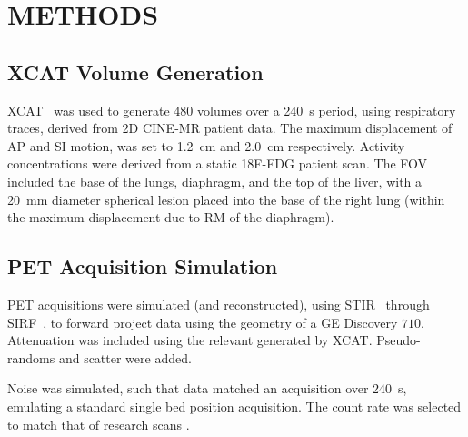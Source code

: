 
\section{METHODS} \label{sec:methods}
    \subsection{\acrshort{XCAT} Volume Generation} \label{sec:xcat_volume_generation}
        \acrshort{XCAT}~\cite{Segars2010} was used to generate $480$ volumes over a \SI{240}{\second} period, using respiratory traces, derived from \acrshort{2D} CINE-\acrshort{MR} patient data. The maximum displacement of \gls{AP} and \gls{SI} motion, was set to \SI{1.2}{\centi\metre} and \SI{2.0}{\centi\metre} respectively. Activity concentrations were derived from a static \acrshort{18F-FDG} patient scan. The \acrlong{FOV} included the base of the lungs, diaphragm, and the top of the liver, with a \SI{20}{\milli\metre} diameter spherical lesion %
        placed into the base of the right lung (within the maximum displacement due to \acrlong{RM} of the diaphragm).
    
    
    \subsection{\acrshort{PET} Acquisition Simulation} \label{sec:pet_acquisition_simulation}
        \acrshort{PET} acquisitions were simulated (and reconstructed), using \acrshort{STIR}~\cite{Thielemans2012, Nikos2019} through \acrshort{SIRF}~\cite{Ovtchinnikov2017}, to forward project data using the geometry of a \acrshort{GE} Discovery $710$. Attenuation was included using the relevant  generated by \acrshort{XCAT}. Pseudo-randoms and scatter were added.%
        
        Noise was simulated, such that data matched an acquisition over \SI{240}{\second}, emulating a standard single bed position acquisition. The count rate was selected to match that of research scans%
        .
        
